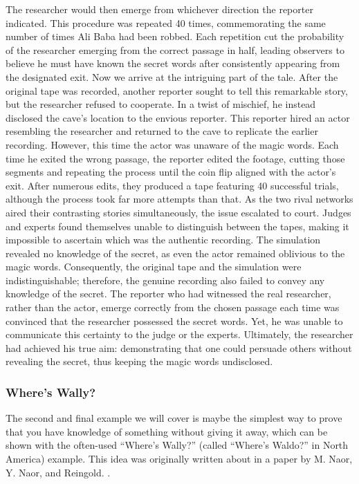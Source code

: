 The researcher would then emerge from whichever direction the reporter indicated. This procedure was repeated 40 times, commemorating the same number of times Ali Baba had been robbed. Each repetition cut the probability of the researcher emerging from the correct passage in half, leading observers to believe he must have known the secret words after consistently appearing from the designated exit.
Now we arrive at the intriguing part of the tale. After the original tape was recorded, another reporter sought to tell this remarkable story, but the researcher refused to cooperate. In a twist of mischief, he instead disclosed the cave's location to the envious reporter. This reporter hired an actor resembling the researcher and returned to the cave to replicate the earlier recording. However, this time the actor was unaware of the magic words. Each time he exited the wrong passage, the reporter edited the footage, cutting those segments and repeating the process until the coin flip aligned with the actor's exit. After numerous edits, they produced a tape featuring 40 successful trials, although the process took far more attempts than that. As the two rival networks aired their contrasting stories simultaneously, the issue escalated to court. Judges and experts found themselves unable to distinguish between the tapes, making it impossible to ascertain which was the authentic recording. The simulation revealed no knowledge of the secret, as even the actor remained oblivious to the magic words. Consequently, the original tape and the simulation were indistinguishable; therefore, the genuine recording also failed to convey any knowledge of the secret. The reporter who had witnessed the real researcher, rather than the actor, emerge correctly from the chosen passage each time was convinced that the researcher possessed the secret words. Yet, he was unable to communicate this certainty to the judge or the experts. Ultimately, the researcher had achieved his true aim: demonstrating that one could persuade others without revealing the secret, thus keeping the magic words undisclosed.

\subsubsection{Where's Wally?} \label{Wally}
The second and final example we will cover is maybe the simplest way to prove that you have knowledge of something without giving it away, which can be shown with the often-used “Where's Wally?” (called “Where's Waldo?” in North America) example. This idea was originally written about in a paper by M. Naor, Y. Naor, and Reingold. \cite{howtoexplainzk}.

